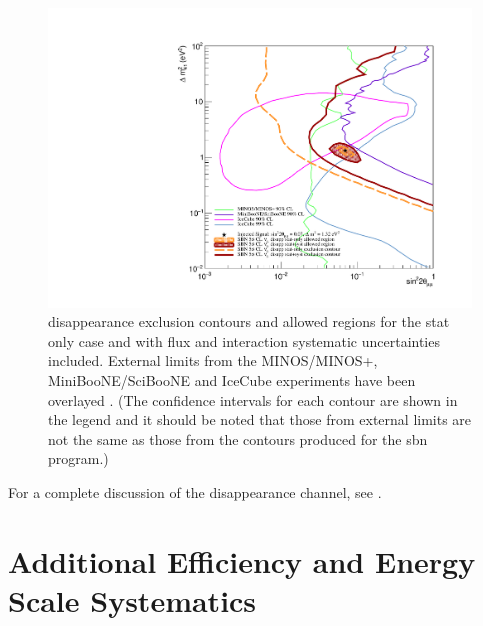 \begin{figure}[h!]
    \centering
    \includegraphics[width = \largefigwidth]{figures-chap6/overlays/valor_overlays_numu_disapp.pdf}
    \caption[\numu disappearance contours with external limits.]{\numu disappearance exclusion contours and allowed regions for the stat only case and with flux and interaction systematic uncertainties included. External limits from the MINOS/MINOS+, MiniBooNE/SciBooNE and IceCube experiments have been overlayed \cite{MINOS_numu_disapp_contour}\cite{MiniBooNE/SciBooNE_numu_disapp_contour}\cite{IceCube_numu_disapp_contour}. (The confidence intervals for each contour are shown in the legend and it should be noted that those from external limits are not the same as those from the contours produced for the \gls{sbn} program.)}
    \label{fig:numu_disapp_global_sensitivity}
\end{figure}

For a complete discussion of the \numu disappearance channel, see \cite{Rhiannon's_thesis}.

\clearpage

\section{Additional Efficiency and Energy Scale Systematics}

